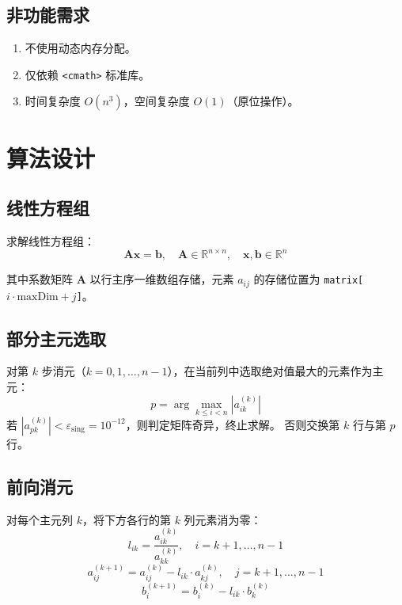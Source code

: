 \documentclass[a4paper,10pt]{article}
\begin{document}
\subsection{非功能需求}

\begin{enumerate}[label=NFR-\arabic*]
  \item 不使用动态内存分配。
  \item 仅依赖 \texttt{<cmath>} 标准库。
  \item 时间复杂度 $O(n^3)$，空间复杂度 $O(1)$（原位操作）。
\end{enumerate}

\section{算法设计}

\subsection{线性方程组}

求解线性方程组：
\begin{equation}
  \mathbf{A}\mathbf{x} = \mathbf{b}, \quad
  \mathbf{A} \in \mathbb{R}^{n \times n}, \quad
  \mathbf{x}, \mathbf{b} \in \mathbb{R}^{n}
\end{equation}

其中系数矩阵 $\mathbf{A}$ 以行主序一维数组存储，元素 $a_{ij}$ 的存储位置为 \texttt{matrix[$i \cdot \text{maxDim} + j$]}。

\subsection{部分主元选取}

对第 $k$ 步消元（$k = 0, 1, \ldots, n{-}1$），在当前列中选取绝对值最大的元素作为主元：
\begin{equation}
  p = \arg\max_{k \leq i < n} |a_{ik}^{(k)}|
\end{equation}
若 $|a_{pk}^{(k)}| < \varepsilon_{\text{sing}} = 10^{-12}$，则判定矩阵奇异，终止求解。
否则交换第 $k$ 行与第 $p$ 行。

\subsection{前向消元}

对每个主元列 $k$，将下方各行的第 $k$ 列元素消为零：
\begin{equation}
  l_{ik} = \frac{a_{ik}^{(k)}}{a_{kk}^{(k)}}, \quad i = k{+}1, \ldots, n{-}1
\end{equation}
\begin{equation}
  a_{ij}^{(k+1)} = a_{ij}^{(k)} - l_{ik} \cdot a_{kj}^{(k)}, \quad j = k{+}1, \ldots, n{-}1
\end{equation}
\begin{equation}
  b_i^{(k+1)} = b_i^{(k)} - l_{ik} \cdot b_k^{(k)}
\end{equation}
\end{document}
